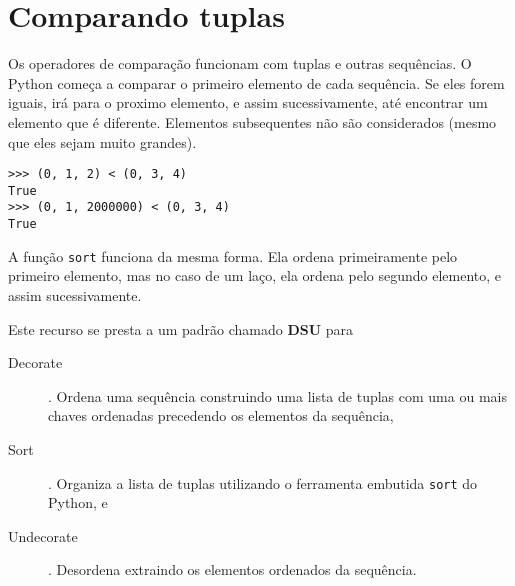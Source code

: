 \section{Comparando tuplas}


Os operadores de comparação funcionam com tuplas e outras sequências.
O Python começa a comparar o primeiro elemento de cada sequência.
Se eles forem iguais, irá para o proximo elemento, e assim sucessivamente,
até encontrar um elemento que é diferente. Elementos subsequentes
não são considerados (mesmo que eles sejam muito grandes).

\beforeverb
\begin{verbatim}
>>> (0, 1, 2) < (0, 3, 4)
True
>>> (0, 1, 2000000) < (0, 3, 4)
True
\end{verbatim}
\afterverb
%
A função {\tt sort} funciona da mesma forma. Ela ordena
primeiramente pelo primeiro elemento, mas no caso de um laço,
ela ordena pelo segundo elemento, e assim sucessivamente.

Este recurso se presta a um padrão chamado {\bf DSU} para

\begin{description}

\item[Decorate]. Ordena uma sequência construindo uma lista de tuplas
com uma ou mais chaves ordenadas precedendo os elementos da sequência,

\item[Sort]. Organiza a lista de tuplas utilizando o ferramenta embutida 
{\tt sort} do Python, e

\item[Undecorate]. Desordena extraindo os elementos ordenados da sequência.

\end{description}


